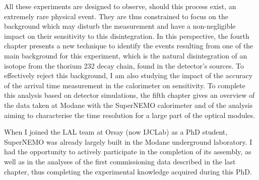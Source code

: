 All these experiments are designed to observe, should this process exist, an extremely rare physical event.
They are thus constrained to focus on the background which may disturb the measurement and have a non-negligible impact on their sensitivity to this disintegration.
In this perspective, the fourth chapter presents a new technique to identify the events resulting from one of the main background for this experiment, which is the natural disintegration of an isotope from the thorium 232 decay chain, found in the detector's sources.
To effectively reject this background, I am also studying the impact of the accuracy of the arrival time measurement in the calorimeter on sensitivity.
To complete this analysis based on detector simulations, the fifth chapter gives an overview of the data taken at Modane with the SuperNEMO calorimeter and of the analysis aiming to characterise the time resolution for a large part of the optical modules.

When I joined the LAL team at Orsay (now IJCLab) as a PhD student, SuperNEMO was already largely built in the Modane underground laboratory.
I had the opportunity to actively participate in the completion of its assembly, as well as in the analyses of the first commissioning data described in the last chapter, thus completing the experimental knowledge acquired during this PhD.
